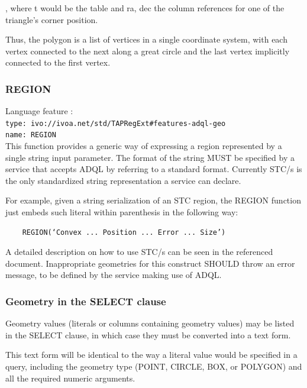 \documentclass[11pt,a4paper]{ivoa}
\begin{document}
, where t would be the table and ra, dec the column references for one of
the triangle’s corner position.

Thus, the polygon is a list of vertices in a single coordinate system, with
each vertex connected to the next along a great circle and the last vertex
implicitly connected to the first vertex.

\subsubsection{REGION}
\label{sec:geom.functions.region}
{\footnotesize Language feature :}\\
{\footnotesize \verb|type: ivo://ivoa.net/std/TAPRegExt#features-adql-geo|}\\
{\footnotesize \verb|name: REGION|}\\

This function provides a generic way of expressing a region represented by
a single string input parameter. The format of the string MUST be specified
by a service that accepts ADQL by referring to a standard format. Currently
STC/s is the only standardized string representation a service can declare.

For example, given a string serialization of an STC region, the REGION
function just embeds such literal within parenthesis in the following way:

\begin{verbatim}
    REGION(‘Convex ... Position ... Error ... Size’)
\end{verbatim}

A detailed description on how to use STC/s can be seen in the referenced
document. Inappropriate geometries for this construct SHOULD throw an
error message, to be defined by the service making use of ADQL.

\subsubsection{Geometry in the SELECT clause}
\label{sec:geom.select}

Geometry values (literals or columns containing geometry values) may be
listed in the SELECT clause, in which case they must be converted into a
text form.

This text form will be identical to the way a literal value would be
specified in a query, including the geometry type (POINT, CIRCLE, BOX,
or POLYGON) and all the required numeric arguments.
\end{document}
